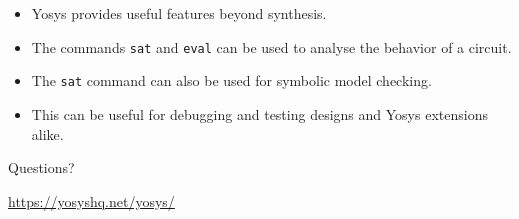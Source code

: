 \begin{frame}{\subsecname}
\begin{itemize}
\item Yosys provides useful features beyond synthesis.
\item The commands {\tt sat} and {\tt eval} can be used to analyse the behavior of a circuit.
\item The {\tt sat} command can also be used for symbolic model checking.
\item This can be useful for debugging and testing designs and Yosys extensions alike.
\end{itemize}

\bigskip
\bigskip
\begin{center}
Questions?
\end{center}

\bigskip
\bigskip
\begin{center}
\url{https://yosyshq.net/yosys/}
\end{center}
\end{frame}


